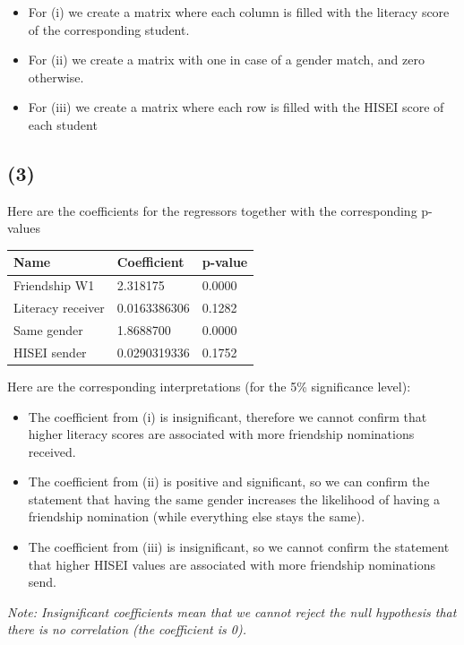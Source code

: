 \documentclass[
]{article}
\providecommand{\tightlist}{%
  \setlength{\itemsep}{0pt}\setlength{\parskip}{0pt}}
\begin{document}
\begin{itemize}
\tightlist
\item
  For (i) we create a matrix where each column is filled with the
  literacy score of the corresponding student.
\item
  For (ii) we create a matrix with one in case of a gender match, and
  zero otherwise.
\item
  For (iii) we create a matrix where each row is filled with the HISEI
  score of each student
\end{itemize}

\subsection{(3)}\label{section-2}

Here are the coefficients for the regressors together with the
corresponding p-values

\begin{longtable}[]{@{}lll@{}}
\toprule\noalign{}
Name & Coefficient & p-value \\
\midrule\noalign{}
\endhead
\bottomrule\noalign{}
\endlastfoot
Friendship W1 & 2.318175 & 0.0000 \\
Literacy receiver & 0.0163386306 & 0.1282 \\
Same gender & 1.8688700 & 0.0000 \\
HISEI sender & 0.0290319336 & 0.1752 \\
\end{longtable}

Here are the corresponding interpretations (for the 5\% significance
level):

\begin{itemize}
\tightlist
\item
  The coefficient from (i) is insignificant, therefore we cannot confirm
  that higher literacy scores are associated with more friendship
  nominations received.
\item
  The coefficient from (ii) is positive and significant, so we can
  confirm the statement that having the same gender increases the
  likelihood of having a friendship nomination (while everything else
  stays the same).
\item
  The coefficient from (iii) is insignificant, so we cannot confirm the
  statement that higher HISEI values are associated with more friendship
  nominations send.
\end{itemize}

\emph{Note: Insignificant coefficients mean that we cannot reject the
null hypothesis that there is no correlation (the coefficient is 0).}
\end{document}
